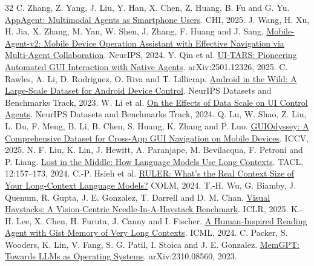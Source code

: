 \begingroup\small\setlength{\bibsep}{2pt}
\begin{thebibliography}{32}
 C. Zhang, Z. Yang, J. Liu, Y. Han, X. Chen, Z. Huang, B. Fu and G. Yu. \href{https://arxiv.org/abs/2312.13771}{AppAgent: Multimodal Agents as Smartphone Users}. CHI, 2025.
 J. Wang, H. Xu, H. Jia, X. Zhang, M. Yan, W. Shen, J. Zhang, F. Huang and J. Sang. \href{https://proceedings.neurips.cc/paper_files/paper/2024/hash/0520537ba799d375b8ff5523295c337a-Abstract-Conference.html}{Mobile-Agent-v2: Mobile Device Operation Assistant with Effective Navigation via Multi-Agent Collaboration}. NeurIPS, 2024.
 Y. Qin et al. \href{https://arxiv.org/abs/2501.12326}{UI-TARS: Pioneering Automated GUI Interaction with Native Agents}. arXiv:2501.12326, 2025.
 C. Rawles, A. Li, D. Rodriguez, O. Riva and T. Lillicrap. \href{https://arxiv.org/abs/2307.10088}{Android in the Wild: A Large-Scale Dataset for Android Device Control}. NeurIPS Datasets and Benchmarks Track, 2023.
 W. Li et al. \href{https://arxiv.org/abs/2406.03679}{On the Effects of Data Scale on UI Control Agents}. NeurIPS Datasets and Benchmarks Track, 2024.
 Q. Lu, W. Shao, Z. Liu, L. Du, F. Meng, B. Li, B. Chen, S. Huang, K. Zhang and P. Luo. \href{https://openaccess.thecvf.com/content/ICCV2025/html/Lu_GUIOdyssey_A_Comprehensive_Dataset_for_Cross-App_GUI_Navigation_on_Mobile_ICCV_2025_paper.html}{GUIOdyssey: A Comprehensive Dataset for Cross-App GUI Navigation on Mobile Devices}. ICCV, 2025.
 N. F. Liu, K. Lin, J. Hewitt, A. Paranjape, M. Bevilacqua, F. Petroni and P. Liang. \href{https://aclanthology.org/2024.tacl-1.9/}{Lost in the Middle: How Language Models Use Long Contexts}. TACL, 12:157--173, 2024.
 C.-P. Hsieh et al. \href{https://arxiv.org/abs/2404.06654}{RULER: What's the Real Context Size of Your Long-Context Language Models?} COLM, 2024.
 T.-H. Wu, G. Biamby, J. Quenum, R. Gupta, J. E. Gonzalez, T. Darrell and D. M. Chan. \href{https://arxiv.org/abs/2407.13766}{Visual Haystacks: A Vision-Centric Needle-In-A-Haystack Benchmark}. ICLR, 2025.
 K.-H. Lee, X. Chen, H. Furuta, J. Canny and I. Fischer. \href{https://proceedings.mlr.press/v235/lee24c.html}{A Human-Inspired Reading Agent with Gist Memory of Very Long Contexts}. ICML, 2024.
 C. Packer, S. Wooders, K. Lin, V. Fang, S. G. Patil, I. Stoica and J. E. Gonzalez. \href{https://arxiv.org/abs/2310.08560}{MemGPT: Towards LLMs as Operating Systems}. arXiv:2310.08560, 2023.

\end{thebibliography}
